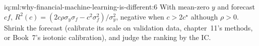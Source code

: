 \begin{solution}{iq:ml:why-financial-machine-learning-is-different:6}
With mean-zero $y$ and forecast $cf$, $R^2(c) = (2c\rho\sigma_y\sigma_f - c^2\sigma_f^2)/\sigma_y^2$, negative when $c > 2c^\star$
although $\rho > 0$. Shrink the forecast (calibrate its scale on validation data, chapter~11's methods, or Book~7's
isotonic calibration), and judge the ranking by the IC.
\end{solution}
